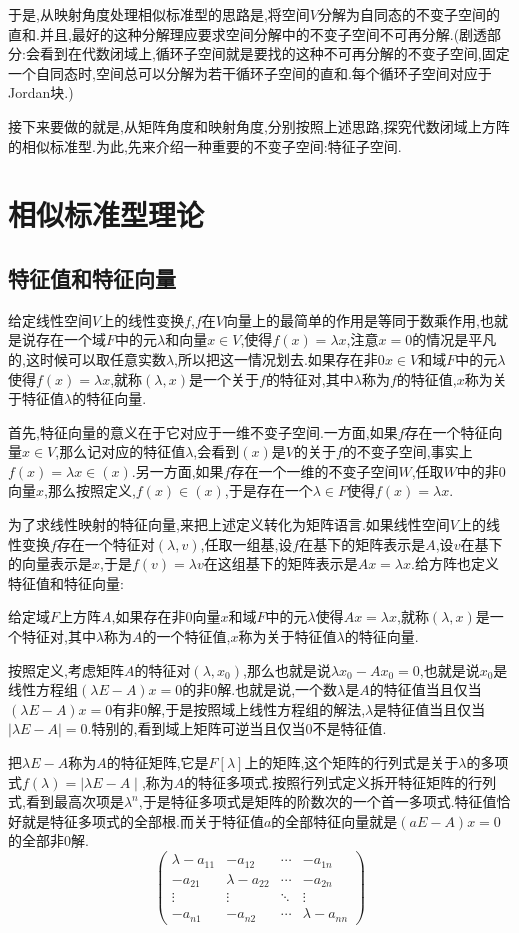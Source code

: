于是,从映射角度处理相似标准型的思路是,将空间$V$分解为自同态的不变子空间的直和.并且,最好的这种分解理应要求空间分解中的不变子空间不可再分解.(剧透部分:会看到在代数闭域上,循环子空间就是要找的这种不可再分解的不变子空间,固定一个自同态时,空间总可以分解为若干循环子空间的直和.每个循环子空间对应于Jordan块.)

接下来要做的就是,从矩阵角度和映射角度,分别按照上述思路,探究代数闭域上方阵的相似标准型.为此,先来介绍一种重要的不变子空间:特征子空间.
\newpage
\section{相似标准型理论}
\subsection{特征值和特征向量}

给定线性空间$V$上的线性变换$f$,$f$在$V$向量上的最简单的作用是等同于数乘作用,也就是说存在一个域$F$中的元$\lambda$和向量$x\in V$,使得$f(x)=\lambda x$,注意$x=0$的情况是平凡的,这时候可以取任意实数$\lambda$,所以把这一情况划去.如果存在非0$x\in V$和域$F$中的元$\lambda$使得$f(x)=\lambda x$,就称$(\lambda,x)$是一个关于$f$的特征对,其中$\lambda$称为$f$的特征值,$x$称为关于特征值$\lambda$的特征向量.

首先,特征向量的意义在于它对应于一维不变子空间.一方面,如果$f$存在一个特征向量$x\in V$,那么记对应的特征值$\lambda$,会看到$(x)$是$V$的关于$f$的不变子空间,事实上$f(x)=\lambda x\in (x)$.另一方面,如果$f$存在一个一维的不变子空间$W$,任取$W$中的非0向量$x$,那么按照定义,$f(x)\in (x)$,于是存在一个$\lambda\in F$使得$f(x)=\lambda x$.

为了求线性映射的特征向量,来把上述定义转化为矩阵语言.如果线性空间$V$上的线性变换$f$存在一个特征对$(\lambda,v)$,任取一组基,设$f$在基下的矩阵表示是$A$,设$v$在基下的向量表示是$x$,于是$f(v)=\lambda v$在这组基下的矩阵表示是$Ax=\lambda x$.给方阵也定义特征值和特征向量:

给定域$F$上方阵$A$,如果存在非0向量$x$和域$F$中的元$\lambda$使得$Ax=\lambda x$,就称$(\lambda,x)$是一个特征对,其中$\lambda$称为$A$的一个特征值,$x$称为关于特征值$\lambda$的特征向量.

按照定义,考虑矩阵$A$的特征对$(\lambda,x_0)$,那么也就是说$\lambda x_0-Ax_0=0$,也就是说$x_0$是线性方程组$(\lambda E-A)x=0$的非0解.也就是说,一个数$\lambda$是$A$的特征值当且仅当$(\lambda E-A)x=0$有非0解,于是按照域上线性方程组的解法,$\lambda$是特征值当且仅当$\mid\lambda E-A\mid=0$.特别的,看到域上矩阵可逆当且仅当0不是特征值.

把$\lambda E-A$称为$A$的特征矩阵,它是$F[\lambda]$上的矩阵,这个矩阵的行列式是关于$\lambda$的多项式$f(\lambda)=\mid\lambda E-A\mid$,称为$A$的特征多项式.按照行列式定义拆开特征矩阵的行列式,看到最高次项是$\lambda^n$,于是特征多项式是矩阵的阶数次的一个首一多项式.特征值恰好就是特征多项式的全部根.而关于特征值$a$的全部特征向量就是$(aE-A)x=0$的全部非0解.
$$\left(\begin{array}{cccc}
\lambda-a_{11}&-a_{12}&\cdots&-a_{1n}\\
-a_{21}&\lambda-a_{22}&\cdots&-a_{2n}\\
\vdots&\vdots&\ddots&\vdots\\
-a_{n1}&-a_{n2}&\cdots&\lambda-a_{nn}\end{array}\right)$$

